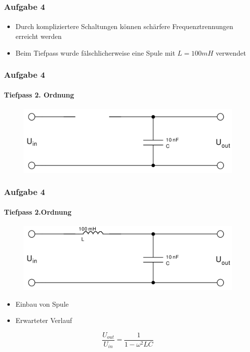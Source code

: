 \begin{frame}
\frametitle{Aufgabe 4}
\framesubtitle{}
    \begin{itemize}
        \item Durch kompliziertere Schaltungen können schärfere
        Frequenztrennungen erreicht werden
        \item Beim Tiefpass wurde fälschlicherweise eine Spule mit $L=100mH$
        verwendet
    \end{itemize}
\end{frame}
\begin{frame}
\frametitle{Aufgabe 4}
\framesubtitle{Tiefpass 2. Ordnung}
\begin{figure}[H]
\begin{center}
        \includegraphics[scale=0.2]{./img/4a_tiefpass_1.png}
\end{center}
\end{figure}
\end{frame}
\begin{frame}
\frametitle{Aufgabe 4}
\framesubtitle{Tiefpass 2.Ordnung}
\begin{figure}[H]
\begin{center}
        \includegraphics[scale=0.2]{./img/4a_tiefpass_2.png}
\end{center}
\end{figure}
\begin{itemize}
    \item Einbau von Spule
    \item Erwarteter Verlauf
\end{itemize}
\begin{equation*}
    \frac{U_{out}}{U_{in}} = \frac{1}{1-\omega^2 L C}
\end{equation*}
\end{frame}
